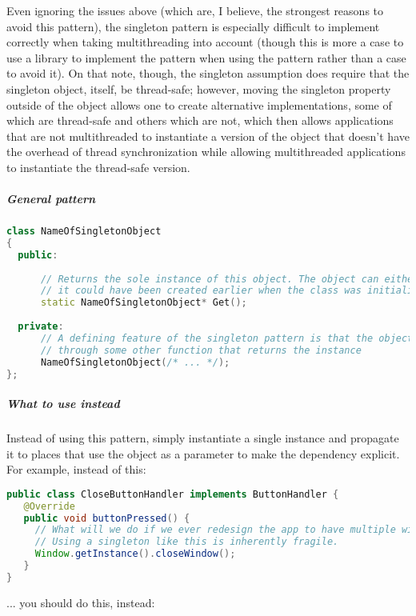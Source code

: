 \documentclass{book}
\begin{document}
Even ignoring the issues above (which are, I believe, the strongest reasons to avoid this pattern),
the singleton pattern is especially difficult to implement correctly when
taking multithreading into account (though this is more a case to use a library to implement the pattern when using the pattern rather than a case to avoid it).
On that note, though, the singleton assumption does require that the singleton object, itself, be thread-safe;
however, moving the singleton property outside of the object allows one to create alternative implementations,
some of which are thread-safe and others which are not,
which then allows applications that are not multithreaded to instantiate a version of the object 
that doesn't have the overhead of thread synchronization while allowing multithreaded applications to instantiate the thread-safe version.
\subparagraph{General pattern}
\begin{lstlisting}[caption={General Pattern}, language=C++]
class NameOfSingletonObject 
{
  public:
    
      // Returns the sole instance of this object. The object can either be lazily created on the first invocation (a "lazy singleton") or
      // it could have been created earlier when the class was initialized, such as by using static field initialization (an "eager singleton").
      static NameOfSingletonObject* Get();
    
  private:
      // A defining feature of the singleton pattern is that the object cannot be constructed directly and instead is retrieved
      // through some other function that returns the instance
      NameOfSingletonObject(/* ... */);
};
\end{lstlisting}    

\subparagraph{What to use instead}

Instead of using this pattern, simply instantiate a single instance and propagate it to places that use the object as a parameter to make the dependency explicit.
For example, instead of this:
\begin{lstlisting}[caption={BAD: Using singleton}, language=Java]
public class CloseButtonHandler implements ButtonHandler {
   @Override
   public void buttonPressed() {
     // What will we do if we ever redesign the app to have multiple windows?
     // Using a singleton like this is inherently fragile.
     Window.getInstance().closeWindow();
   }
}
\end{lstlisting}    

... you should do this, instead:
\end{document}
